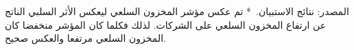 المصدر: نتائج الاستبيان.\
* تم عكس مؤشر المخزون السلعي ليعكس الأثر السلبي الناتج عن ارتفاع المخزون السلعي على الشركات. لذلك فكلما كان المؤشر منخفضا كان المخزون السلعي مرتفعا والعكس صحيح.
